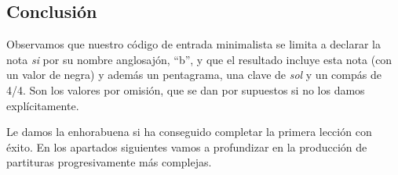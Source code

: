 \subsection{Conclusión}

Observamos que nuestro código de entrada minimalista se limita a
declarar la nota \emph{si} por su nombre anglosajón, ``b'', y que el
resultado incluye esta nota (con un valor de negra) y además un
pentagrama, una clave de \emph{sol} y un compás de 4/4.  Son los
valores por omisión, que se dan por supuestos si no los damos
explícitamente.

Le damos la enhorabuena si ha conseguido completar la primera lección
con éxito. En los apartados siguientes vamos a profundizar en la
producción de partituras progresivamente más complejas.
